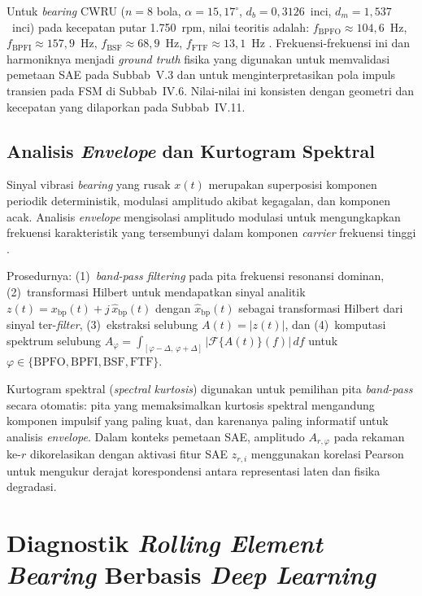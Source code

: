 {\color{blue}Untuk \emph{bearing} CWRU ($n = 8$ bola, $\alpha = 15{,}17^{\circ}$,
$d_b = 0{,}3126$~inci, $d_m = 1{,}537$~inci) pada kecepatan putar 1.750~rpm,
nilai teoritis adalah: $f_\text{BPFO} \approx 104{,}6$~Hz,
$f_\text{BPFI} \approx 157{,}9$~Hz, $f_\text{BSF} \approx 68{,}9$~Hz,
$f_\text{FTF} \approx 13{,}1$~Hz .}
Frekuensi-frekuensi ini
dan harmoniknya menjadi \emph{ground truth} fisika yang digunakan untuk
memvalidasi pemetaan SAE pada Subbab~V.3 dan untuk menginterpretasikan pola impuls
transien pada FSM di Subbab~IV.6.
{\color{blue}Nilai-nilai ini konsisten dengan geometri dan kecepatan
yang dilaporkan pada Subbab~IV.11.}

\subsection{Analisis \emph{Envelope} dan Kurtogram Spektral}
\label{subsec:bab2_envelope}

Sinyal vibrasi \emph{bearing} yang rusak $x(t)$ merupakan superposisi komponen
periodik deterministik, modulasi amplitudo akibat kegagalan, dan komponen
acak. Analisis \emph{envelope} mengisolasi amplitudo modulasi untuk
mengungkapkan frekuensi karakteristik yang tersembunyi dalam komponen
\emph{carrier} frekuensi tinggi .

Prosedurnya: (1)~\emph{band-pass filtering} pada pita frekuensi resonansi
dominan, (2)~transformasi Hilbert untuk mendapatkan sinyal analitik
$z(t) = x_\text{bp}(t) + j\,\hat{x}_\text{bp}(t)$ dengan
$\hat{x}_\text{bp}(t)$ sebagai transformasi Hilbert dari sinyal ter-\emph{filter},
(3)~ekstraksi selubung $A(t) = |z(t)|$, dan (4)~komputasi spektrum selubung
$A_\varphi = \int_{[\varphi-\Delta,\, \varphi+\Delta]} |\mathcal{F}\{A(t)\}(f)|\,df$
untuk $\varphi \in \{\text{BPFO}, \text{BPFI}, \text{BSF}, \text{FTF}\}$.

Kurtogram spektral (\emph{spectral kurtosis}) 
digunakan untuk pemilihan pita \emph{band-pass} secara otomatis: pita yang
memaksimalkan kurtosis spektral mengandung komponen impulsif yang paling kuat,
dan karenanya paling informatif untuk analisis \emph{envelope}. Dalam konteks
pemetaan SAE, amplitudo $A_{r,\varphi}$ pada rekaman ke-$r$ dikorelasikan
dengan aktivasi fitur SAE $z_{r,i}$ menggunakan korelasi Pearson untuk mengukur
derajat korespondensi antara representasi laten dan fisika degradasi.

\section{Diagnostik \emph{Rolling Element Bearing} Berbasis \emph{Deep Learning}}
\label{sec:bab2_diagnostik}


